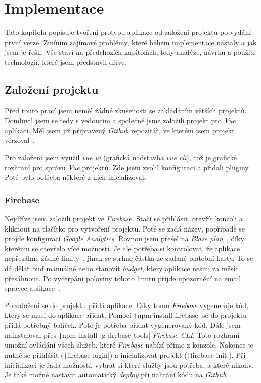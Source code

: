 
\chapter{Implementace}
Tato kapitola popisuje tvoření protypu aplikace od založení projektu po vydání první verze. Zmíním zajímavé problémy,
které během implementace nastaly a jak jsem je řešil. Vše staví na předchozích kapitolách, tedy analýze, návrhu a použití
technologií, které jsem představil dříve.

\section{Založení projektu}
Před touto prací jsem neměl žádné zkušenosti se zakládáním větších projektů. Domluvil jsem se tedy s vedoucím a společně
jsme založili projekt pro \emph{Vue} aplikaci. Měl jsem již připravený \emph{Github} repozitář, ve kterém jsem projekt
verzoval~\cite{GithubAbout}.

Pro založení jsem využil \emph{vue ui} (grafická nadstavba \emph{vue cli}), což je grafické rozhraní pro správu \emph{Vue} projektů.
Zde jsem zvolil konfiguraci a přidali pluginy. Poté bylo potřeba některé z nich inicializovat.

\subsection{Firebase}
Nejdříve jsem založili projekt ve \emph{Firebase}. Stačí se přihlásit, otevřít konzoli a kliknout na tlačítko pro vytvoření projektu.
Poté se zadá název, popřípadě se projde konfigurací \emph{Google Analytics}. Rovnou jsem přešel na \emph{Blaze plan}~\cite{FirebasePricing}, díky kterému
se otevřelo více možností. Je ale potřeba si kontrolovat, že aplikace nepřesáhne žádné limity~\cite{FirebaseLimits}, jinak se strhne
částka ze zadané platební karty. To se dá dělat buď manuálně nebo stanovit \emph{budget}, který aplikace nesmí za měsíc přesáhnout.
Po vyčerpání poloviny tohoto limitu přijde upozornění na email správce aplikace~\cite{FirebaseBudget}.

Po založení se do projektu přidá aplikace. Díky tomu \emph{Firebase} vygeneruje kód, který se musí do aplikace přidat.
Pomocí \texttt|npm install firebase| se do projektu přidá potřebný balíček. Poté je potřeba přidat vygenerovaný
kód. Dále jsem nainstaloval přes \texttt|npm install -g firebase-tools| \emph{Firebase CLI}. Toto rozhraní umožní
ovládání všech služeb, které \emph{Firebase} nabízí přímo z konzole. Nakonec je nutné se přihlásit (\texttt|firebase login|) a %
inicializovat projekt (\texttt|firebase init|). Při inicializaci je řada možností, vybrat si které služby jsou potřeba,
a které nikoliv. Je také možné nastavit automatický \emph{deploy} při nahrání kódu na \emph{Github}.

